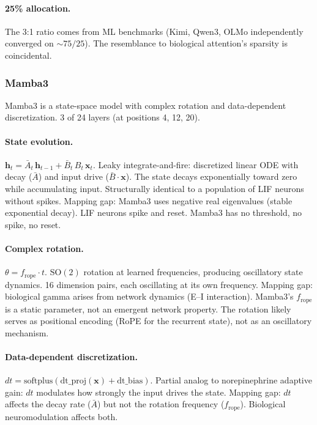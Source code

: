 \documentclass[11pt,a4paper]{article}
\begin{document}
\paragraph{25\% allocation.}
The 3:1 ratio comes from ML benchmarks (Kimi, Qwen3, OLMo independently converged on ${\sim}75/25$). The resemblance to biological attention's sparsity is coincidental.

\subsubsection{Mamba3}

Mamba3 is a state-space model with complex rotation and data-dependent discretization. 3 of 24 layers (at positions 4, 12, 20).

\paragraph{State evolution.}
$\mathbf{h}_t = \bar{A}_t \, \mathbf{h}_{t-1} + \bar{B}_t \, B_t \, \mathbf{x}_t$. Leaky integrate-and-fire: discretized linear ODE with decay ($\bar{A}$) and input drive ($\bar{B} \cdot \mathbf{x}$). The state decays exponentially toward zero while accumulating input. Structurally identical to a population of LIF neurons without spikes. Mapping gap: Mamba3 uses negative real eigenvalues (stable exponential decay). LIF neurons spike and reset. Mamba3 has no threshold, no spike, no reset.

\paragraph{Complex rotation.}
$\theta = f_{\mathrm{rope}} \cdot t$. $\mathrm{SO}(2)$ rotation at learned frequencies, producing oscillatory state dynamics. 16 dimension pairs, each oscillating at its own frequency. Mapping gap: biological gamma arises from network dynamics (E--I interaction). Mamba3's $f_{\mathrm{rope}}$ is a static parameter, not an emergent network property. The rotation likely serves as positional encoding (RoPE for the recurrent state), not as an oscillatory mechanism.

\paragraph{Data-dependent discretization.}
$dt = \mathrm{softplus}(\mathrm{dt\_proj}(\mathbf{x}) + \mathrm{dt\_bias})$. Partial analog to norepinephrine adaptive gain: $dt$ modulates how strongly the input drives the state. Mapping gap: $dt$ affects the decay rate ($\bar{A}$) but not the rotation frequency ($f_{\mathrm{rope}}$). Biological neuromodulation affects both.
\end{document}
